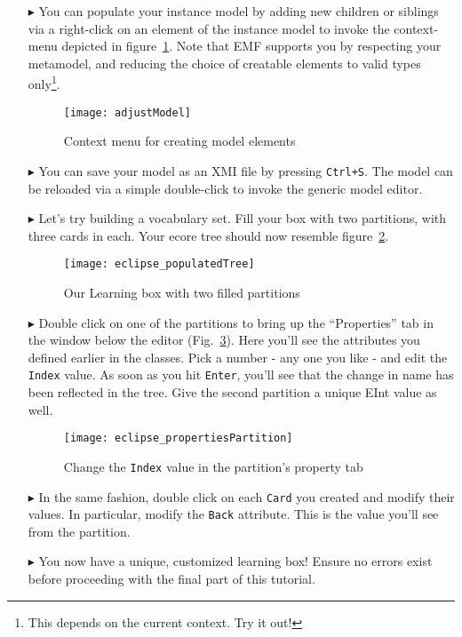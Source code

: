\begin{itemize}
\item[$\blacktriangleright$] You can populate your instance model by adding new children or siblings via a right-click on an element of the instance model to invoke the context-menu depicted in figure~\ref{fig:create_instance}.
Note that EMF supports you by respecting your metamodel, and reducing the choice of creatable elements to valid types only\footnote{This depends on the current context. Try it out!}.

\begin{figure}[htbp]
	\centering
  \texttt{[image: adjustModel]}
	\caption{Context menu for creating model elements}
	\label{fig:create_instance}
\end{figure}

\item[$\blacktriangleright$] You can save your model as an XMI file by pressing \texttt{Ctrl+S}.
The model can be reloaded via a simple double-click to invoke the generic model editor.

\item[$\blacktriangleright$] Let's try building a vocabulary set. Fill your box with two partitions, with three cards in each. Your ecore tree should now resemble figure~\ref{fig:eclipse_populatedTree}.

\begin{figure}[htbp]
	\centering
  \texttt{[image: eclipse\_populatedTree]}
	\caption{Our Learning box with two filled partitions}
	\label{fig:eclipse_populatedTree}
\end{figure}

\vfill
\pagebreak

\item[$\blacktriangleright$] Double click on one of the partitions to bring up the ``Properties'' tab in the window below the editor (Fig.~\ref{fig:properties_partition}). Here you'll see the attributes you defined earlier in the classes. Pick a number - any one you like - and edit the \texttt{Index} value. As soon as you hit \texttt{Enter}, you'll see that the change in name has been reflected in the tree. Give the second partition a unique EInt value as well.

\begin{figure}[htbp]
	\centering
  \texttt{[image: eclipse\_propertiesPartition]}
	\caption{Change the \texttt{Index} value in the partition's property tab}
	\label{fig:properties_partition}
\end{figure}

\item[$\blacktriangleright$] In the same fashion, double click on each \texttt{Card} you created and modify their values. In particular, modify the \texttt{Back} attribute. This is the value you'll see from the partition.

\item[$\blacktriangleright$] You now have a unique, customized learning box! Ensure no errors exist before proceeding with the final part of this tutorial.

\end{itemize}

